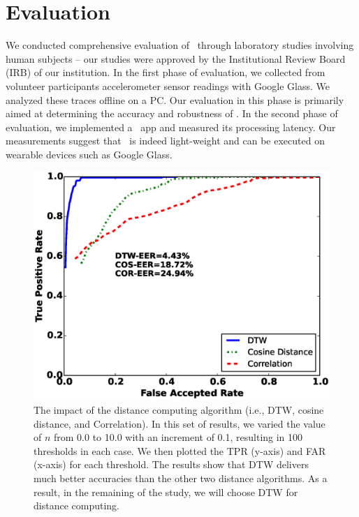 \section{Evaluation}\label{sec:results}

We conducted comprehensive evaluation of \systemname~through laboratory studies involving
human subjects -- our studies were approved by the Institutional Review Board (IRB) of our
institution. In the first phase of evaluation, we collected from volunteer participants accelerometer sensor
readings with Google Glass. We analyzed these traces offline on a PC.
Our evaluation in this phase is primarily aimed at determining the accuracy and robustness of \systemname. 
In the second phase of evaluation, we implemented a \systemname~app and measured its processing latency. Our measurements suggest that \systemname~is indeed light-weight and can be executed on wearable devices such as Google Glass.


\begin{figure}\centering
\includegraphics[width=.75\columnwidth]{figure/roc_dtw_cos_cor.eps}
\caption{\label{fig:roc_dtw_cos_cor} The impact of the distance computing algorithm (i.e., DTW, cosine distance, and Correlation). In this set of results, we varied the value of $n$ from 0.0 to 10.0 with an increment of 0.1, resulting in 100 thresholds in each case. We then plotted the TPR (y-axis) and FAR (x-axis) for each threshold. The results show that DTW delivers much better accuracies than the other two distance algorithms. As a result, in the remaining of the study, we will choose DTW for distance computing.}
\end{figure}

